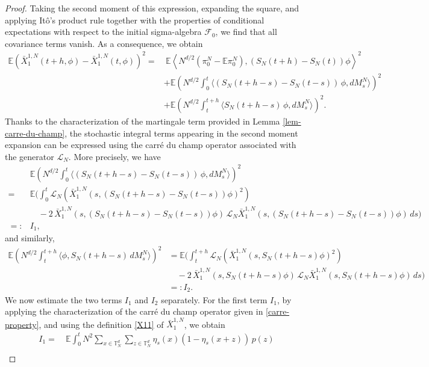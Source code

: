 \documentclass[UTF-8,reqno]{amsart}
\numberwithin{equation}{section}
\begin{document}
\begin{proof}
Taking the second moment of this expression, expanding the square, and applying It\^o's product rule together with the properties of conditional expectations with respect to the initial sigma-algebra $\mathcal{F}_0$, we find that all covariance terms vanish. As a consequence, we obtain
\begin{align*}
\mathbb{E} \left( \bar{X}^{1,N}_1(t+h,\phi) - \bar{X}^{1,N}_1(t,\phi) \right)^2 
=&\ \mathbb{E} \left\langle N^{d/2}(\pi^N_0 - \mathbb{E}\pi^N_0), (S_N(t+h)-S_N(t))\phi \right\rangle^2 \\
&+ \mathbb{E} \left( N^{d/2} \int_0^t \langle (S_N(t+h-s) - S_N(t-s))\, \phi, dM^N_s \rangle \right)^2 \\
&+ \mathbb{E} \left( N^{d/2} \int_t^{t+h} \langle S_N(t+h-s)\,\phi,  dM^N_s \rangle \right)^2.
\end{align*}
Thanks to the characterization of the martingale term provided in Lemma \ref{lem-carre-du-champ}, the stochastic integral terms appearing in the second moment expansion can be expressed using the carr\'e du champ operator associated with the generator $\mathcal{L}_N$. More precisely, we have
\begin{align*}
&\mathbb{E}\left( N^{d/2} \int_0^t \langle (S_N(t+h-s) - S_N(t-s))\,\phi,  dM^N_s \rangle \right)^2\\
=& \mathbb{E} \Bigg( \int_0^t \mathcal{L}_N\left( \bar{X}^{1,N}_1(s, (S_N(t+h-s) - S_N(t-s))\phi )^2 \right) \\
&\quad - 2\, \bar{X}^{1,N}_1(s, (S_N(t+h-s) - S_N(t-s))\phi )\, \mathcal{L}_N \bar{X}^{1,N}_1(s, (S_N(t+h-s) - S_N(t-s))\phi ) \, ds \Bigg) \\
=:& I_1,
\end{align*}
and similarly,
\begin{align*}
\mathbb{E}\left( N^{d/2} \int_t^{t+h} \langle \phi, S_N(t+h-s)\, dM^N_s \rangle \right)^2
&= \mathbb{E} \Bigg( \int_t^{t+h} \mathcal{L}_N\left( \bar{X}^{1,N}_1(s, S_N(t+h-s)\phi )^2 \right) \\
&\quad - 2\, \bar{X}^{1,N}_1(s, S_N(t+h-s)\phi )\, \mathcal{L}_N \bar{X}^{1,N}_1(s, S_N(t+h-s)\phi ) \, ds \Bigg) \\
&=: I_2.
\end{align*}
We now estimate the two terms $I_1$ and $I_2$ separately. For the first term $I_1$, by applying the characterization of the carr\'e du champ operator given in \eqref{carre-property}, and using the definition \eqref{X11} of $\bar{X}^{1,N}_1$, we obtain
\begin{align*}
I_1 
=&\ \mathbb{E} \int_0^t N^2 \sum_{x \in \mathbb{T}^d_N} \sum_{z \in \mathbb{T}^d_N} \eta_s(x)(1 - \eta_s(x+z))\, p(z) \\

\end{align*}
\end{proof}
\end{document}
